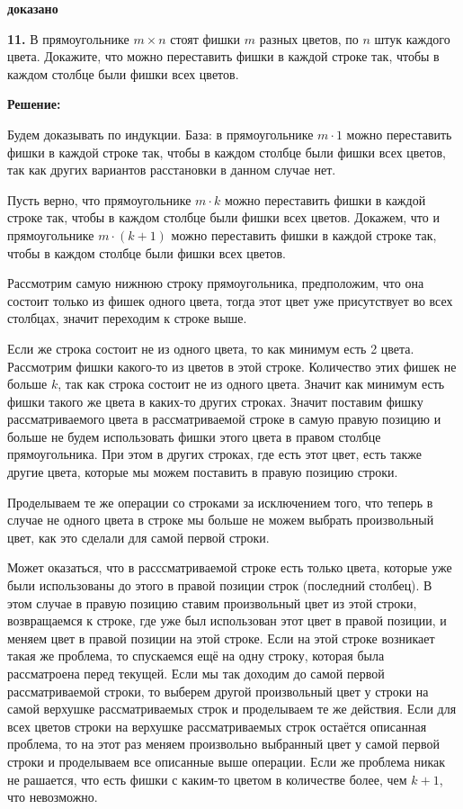 \documentclass[a4paper,12pt]{article} %
\begin{document}
\begin{flushright}
\begin{large}
\textbf {доказано}
\end{large}
\end{flushright}


{\bf 11.} В прямоугольнике $m\times n$ стоят фишки $m$ разных цветов, по $n$ штук
каждого цвета. Докажите, что можно переставить фишки в каждой
строке так, чтобы в каждом столбце были фишки всех цветов.
\begin{center}
\bfseries
{\Large Решение: }
\end{center}


Будем доказывать по индукции. База: в прямоугольнике $m\cdot 1$ можно переставить фишки в каждой строке так, чтобы в каждом столбце были фишки всех цветов, так как других вариантов расстановки в данном случае нет.

Пусть верно, что прямоугольнике $m\cdot k$ можно переставить фишки в каждой строке так, чтобы в каждом столбце были фишки всех цветов. Докажем, что и прямоугольнике $m\cdot (k + 1)$ можно переставить фишки в каждой строке так, чтобы в каждом столбце были фишки всех цветов.

Рассмотрим самую нижнюю строку прямоугольника, предположим, что она состоит только из фишек одного цвета, тогда этот цвет уже присутствует во всех столбцах, значит переходим к строке выше.

Если же строка состоит не из одного цвета, то как минимум есть 2 цвета. Рассмотрим фишки какого-то из цветов в этой строке. Количество этих фишек не больше $k$, так как строка состоит не из одного цвета. Значит как минимум есть фишки такого же цвета в каких-то других строках. Значит поставим фишку рассматриваемого цвета в рассматриваемой строке в самую правую позицию и больше не будем использовать фишки этого цвета в правом столбце прямоугольника. При этом в других строках, где есть этот цвет, есть также другие цвета, которые мы можем поставить в правую позицию строки.

Проделываем те же операции со строками за исключением того, что теперь в случае не одного цвета в строке мы больше не можем выбрать произвольный цвет, как это сделали для самой первой строки.

Может оказаться, что в расссматриваемой строке есть только цвета, которые уже были использованы до этого в правой позиции строк (последний столбец). В этом случае в правую позицию ставим произвольный цвет из этой строки, возвращаемся к строке, где уже был использован этот цвет в правой позиции, и меняем цвет в правой позиции на этой строке. Если на этой строке возникает такая же проблема, то спускаемся ещё на одну строку, которая была рассматроена перед текущей. Если мы так доходим до самой первой рассматриваемой строки, то выберем другой произвольный цвет у строки на самой верхушке рассматриваемых строк и проделываем те же действия.
Если для всех цветов строки на верхушке рассматриваемых строк остаётся описанная проблема, то на этот раз меняем произвольно выбранный цвет у самой первой строки и проделываем все описанные выше операции. Если же проблема никак не рашается, что есть фишки с каким-то цветом в количестве более, чем $k+1$, что невозможно.
\end{document}
